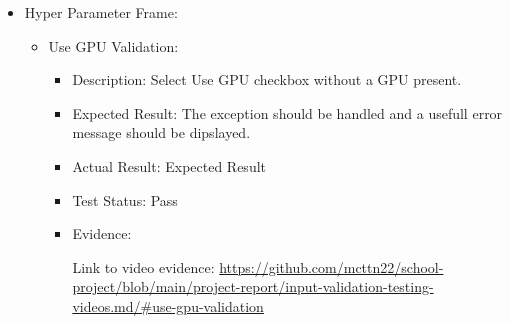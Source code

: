 \documentclass[./project-report/src/latex/project-report.tex]{subfiles}
\begin{document}
\begin{itemize}
    \item Hyper Parameter Frame:
    \begin{itemize}
        \item Use GPU Validation:
            \begin{itemize}
                \item Description: Select Use GPU checkbox without a GPU present.
                \item Expected Result: The exception should be handled and a usefull error message should be dipslayed.
                \item Actual Result: Expected Result
                \item Test Status: Pass
                \item Evidence:
                    \begin{figure}[h!]
                    \centering
                    \end{figure}

                    Link to video evidence: \url{https://github.com/mcttn22/school-project/blob/main/project-report/input-validation-testing-videos.md/#use-gpu-validation}
            \end{itemize}

        \pagebreak


\end{itemize}
\end{itemize}
\end{document}
